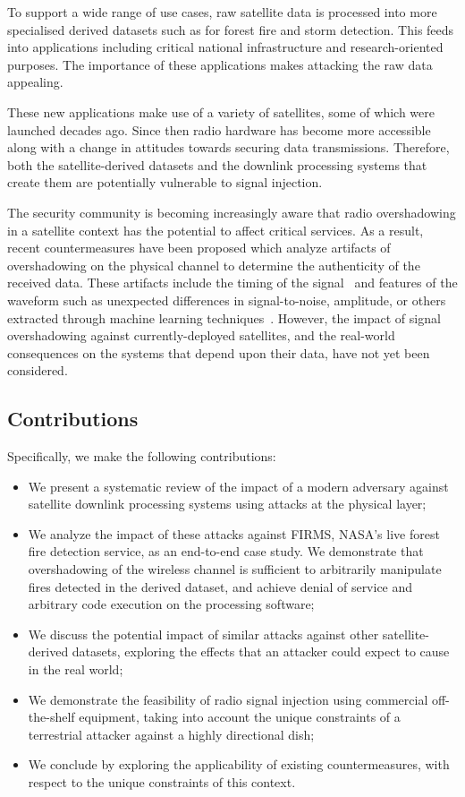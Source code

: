 To support a wide range of use cases, raw satellite data is processed into more specialised derived datasets such as for forest fire and storm detection.
This feeds into applications including critical national infrastructure and research-oriented purposes.
The importance of these applications makes attacking the raw data appealing.

These new applications make use of a variety of satellites, some of which were launched decades ago.
Since then radio hardware has become more accessible along with a change in attitudes towards securing data transmissions.
Therefore, both the satellite-derived datasets and the downlink processing systems that create them are potentially vulnerable to signal injection.

The security community is becoming increasingly aware that radio overshadowing in a satellite context has the potential to affect critical services.
As a result, recent countermeasures have been proposed which analyze artifacts of overshadowing on the physical channel to determine the authenticity of the received data.
These artifacts include the timing of the signal~\cite{jedermann2021orbit} and features of the waveform such as unexpected differences in signal-to-noise, amplitude, or others extracted through machine learning techniques~\cite{oligeri2020past}.
However, the impact of signal overshadowing against currently-deployed satellites, and the real-world consequences on the systems that depend upon their data, have not yet been considered.

\subsection{Contributions}

Specifically, we make the following contributions:

\begin{itemize}
    \item We present a systematic review of the impact of a modern adversary against satellite downlink processing systems using attacks at the physical layer;
    \item We analyze the impact of these attacks against FIRMS, NASA's live forest fire detection service, as an end-to-end case study. We demonstrate that overshadowing of the wireless channel is sufficient to arbitrarily manipulate fires detected in the derived dataset, and achieve denial of service and arbitrary code execution on the processing software;
    \item We discuss the potential impact of similar attacks against other satellite-derived datasets, exploring the effects that an attacker could expect to cause in the real world;
    \item We demonstrate the feasibility of radio signal injection using commercial off-the-shelf equipment, taking into account the unique constraints of a terrestrial attacker against a highly directional dish;
    \item We conclude by exploring the applicability of existing countermeasures, with respect to the unique constraints of this context.
\end{itemize}

